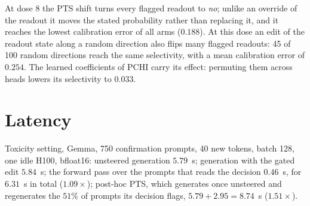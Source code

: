 \begin{table}[h]\footnotesize\setlength{\tabcolsep}{5pt}
\centering
{}
\caption{The setting of PCHI on held-out answers. All three registered tests
pass: PTS above PCHI ($+0.084$ $[0.058, 0.110]$), PTS above the global shift,
and PCHI above its permuted coefficients.}
\label{tab:pchi}
\end{table}

At dose 8 the PTS shift turns every flagged readout to \emph{no}; unlike an
override of the readout it moves the stated probability rather than replacing
it, and it reaches the lowest calibration error of all arms ($0.188$). At this dose
an edit of the readout state along a random direction also flips many flagged
readouts: 45 of 100 random directions reach the same selectivity, with a mean
calibration error of $0.254$. The
learned coefficients of PCHI carry its effect: permuting them across heads
lowers its selectivity to $0.033$.

\section{Latency}
\label{app:latency}

Toxicity setting, Gemma, 750 confirmation prompts, 40 new tokens, batch 128,
one idle H100, bfloat16: unsteered generation $5.79$~s; generation with the
gated edit $5.84$~s; the forward pass over the prompts that reads the decision
$0.46$~s, for $6.31$~s in total ($1.09\times$); post-hoc PTS, which generates
once unsteered and regenerates the $51\%$ of prompts its decision flags,
$5.79+2.95=8.74$~s ($1.51\times$).

